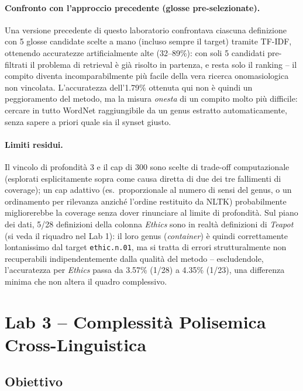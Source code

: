 \documentclass[12pt,a4paper]{article}
\begin{document}
\paragraph{Confronto con l'approccio precedente (glosse pre-selezionate).} Una versione precedente di questo laboratorio confrontava ciascuna definizione con 5 glosse candidate scelte a mano (incluso sempre il target) tramite TF-IDF, ottenendo accuratezze artificialmente alte (32--89\%): con soli 5 candidati pre-filtrati il problema di retrieval \`e gi\`a risolto in partenza, e resta solo il ranking -- il compito diventa incomparabilmente pi\`u facile della vera ricerca onomasiologica non vincolata. L'accuratezza dell'1.79\% ottenuta qui non \`e quindi un peggioramento del metodo, ma la misura \emph{onesta} di un compito molto pi\`u difficile: cercare in tutto WordNet raggiungibile da un genus estratto automaticamente, senza sapere a priori quale sia il synset giusto.

\paragraph{Limiti residui.} Il vincolo di profondit\`a 3 e il cap di 300 sono scelte di trade-off computazionale (esplorati esplicitamente sopra come causa diretta di due dei tre fallimenti di coverage); un cap adattivo (es.\ proporzionale al numero di sensi del genus, o un ordinamento per rilevanza anzich\'e l'ordine restituito da NLTK) probabilmente migliorerebbe la coverage senza dover rinunciare al limite di profondit\`a. Sul piano dei dati, 5/28 definizioni della colonna \textit{Ethics} sono in realt\`a definizioni di \textit{Teapot} (si veda il riquadro nel Lab 1): il loro genus (\textit{container}) \`e quindi correttamente lontanissimo dal target \texttt{ethic.n.01}, ma si tratta di errori strutturalmente non recuperabili indipendentemente dalla qualit\`a del metodo -- escludendole, l'accuratezza per \textit{Ethics} passa da 3.57\% (1/28) a 4.35\% (1/23), una differenza minima che non altera il quadro complessivo.

\section{Lab 3 -- Complessit\`a Polisemica Cross-Linguistica}

\subsection{Obiettivo}
\end{document}
